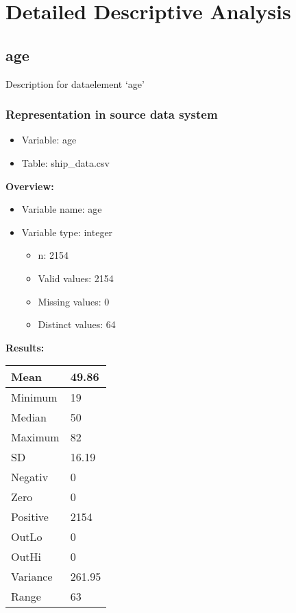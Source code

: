 \documentclass[
]{article}
\providecommand{\tightlist}{%
  \setlength{\itemsep}{0pt}\setlength{\parskip}{0pt}}
\begin{document}
\newpage

\hypertarget{detailed-descriptive-analysis}{%
\section{Detailed Descriptive
Analysis}\label{detailed-descriptive-analysis}}

\hypertarget{age}{%
\subsection{age}\label{age}}

Description for dataelement `age'

\hypertarget{representation-in-source-data-system}{%
\subsubsection{\texorpdfstring{Representation in \textbf{source} data
system}{Representation in source data system}}\label{representation-in-source-data-system}}

\begin{itemize}
\tightlist
\item
  Variable: age
\item
  Table: ship\_data.csv
\end{itemize}

\textbf{Overview:}

\begin{itemize}
\tightlist
\item
  Variable name: age
\item
  Variable type: integer

  \begin{itemize}
  \tightlist
  \item
    n: 2154
  \item
    Valid values: 2154
  \item
    Missing values: 0
  \item
    Distinct values: 64
  \end{itemize}
\end{itemize}

\textbf{Results:}\\

\begin{table}[H]
\centering
\begin{tabular}{l|l}
\hline
Mean & 49.86\\
\hline
Minimum & 19\\
\hline
Median & 50\\
\hline
Maximum & 82\\
\hline
SD & 16.19\\
\hline
Negativ & 0\\
\hline
Zero & 0\\
\hline
Positive & 2154\\
\hline
OutLo & 0\\
\hline
OutHi & 0\\
\hline
Variance & 261.95\\
\hline
Range & 63\\
\hline
\end{tabular}
\end{table}
\end{document}
